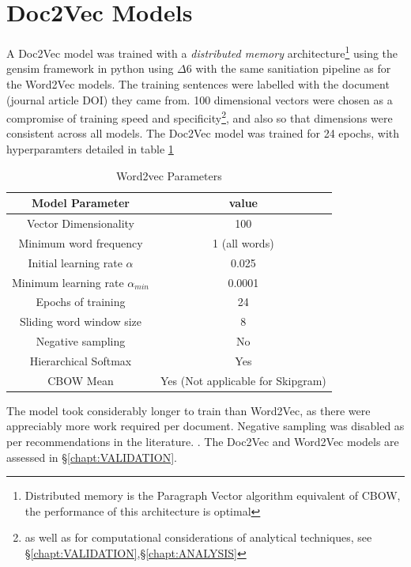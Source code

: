 \section{Doc2Vec Models}
A Doc2Vec model was trained with a \emph{distributed memory} architecture\footnote{Distributed memory is the Paragraph Vector algorithm equivalent of CBOW, the performance of this architecture is optimal\cite{doc2vec}} using the gensim framework in python \cite{gensim} using $\Delta6$ with the same sanitiation pipeline as for the Word2Vec models. The training sentences were labelled with the document (journal article DOI) they came from. 100 dimensional vectors were chosen as a compromise of training speed and specificity\footnote{as well as for computational considerations of analytical techniques, see \S\ref{chapt:VALIDATION},\S\ref{chapt:ANALYSIS}}, and also so that dimensions were consistent across all models. The Doc2Vec model was trained for 24 epochs, with hyperparamters detailed in table \ref{tab:doc2vechyperparams}
\begin{table}[H]
\begin{center}
\label{tab:doc2vechyperparams}
\caption{Word2vec Parameters}
\begin{tabular}{||c|c||}
\hline
Model Parameter & value\\
\hline
Vector Dimensionality & 100\\
Minimum word frequency & 1 (all words)\\
Initial learning rate $\alpha$ & 0.025 \\
Minimum learning rate $\alpha_{min}$&0.0001\\
Epochs of training & 24\\
Sliding word window size & 8\\
Negative sampling & No \\
Hierarchical Softmax & Yes\\
CBOW Mean & Yes (Not applicable for Skipgram) \\
\hline
\end{tabular}
\end{center}
\end{table}

The model took considerably longer to train than Word2Vec, as there were appreciably more work required per  document. Negative sampling was disabled as per recommendations in the literature. \cite{gensim} \cite{doc2vec}.
The Doc2Vec and Word2Vec models are assessed in \S\ref{chapt:VALIDATION}.
